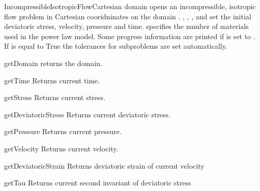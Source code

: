\begin{classdesc}{IncompressibleIsotropicFlowCartesian}{
domain
}
opens an incompressible, isotropic flow problem in Cartesian cooridninates
on the domain .
,
,
, and
 set the initial deviatoric stress, velocity, pressure and time.
 specifies the number of materials used in the power law
model. Some progress information are printed if  is set to
\True. If  is equal to True the tolerances for subproblems are set automatically.
\end{classdesc}

\begin{methoddesc}[IncompressibleIsotropicFlowCartesian]{getDomain}{}
returns the domain.
\end{methoddesc}

\begin{methoddesc}[IncompressibleIsotropicFlowCartesian]{getTime}{}
Returns current time.
\end{methoddesc}

\begin{methoddesc}[IncompressibleIsotropicFlowCartesian]{getStress}{}
Returns current stress.
\end{methoddesc}

\begin{methoddesc}[IncompressibleIsotropicFlowCartesian]{getDeviatoricStress}{}
Returns current deviatoric stress.
\end{methoddesc}

\begin{methoddesc}[IncompressibleIsotropicFlowCartesian]{getPressure}{}
Returns current pressure.
\end{methoddesc}

\begin{methoddesc}[IncompressibleIsotropicFlowCartesian]{getVelocity}{}
Returns current velocity.
\end{methoddesc}

\begin{methoddesc}[IncompressibleIsotropicFlowCartesian]{getDeviatoricStrain}{}
Returns deviatoric strain of current velocity
\end{methoddesc}

\begin{methoddesc}[IncompressibleIsotropicFlowCartesian]{getTau}{}
Returns current second invariant of deviatoric stress
\end{methoddesc}

